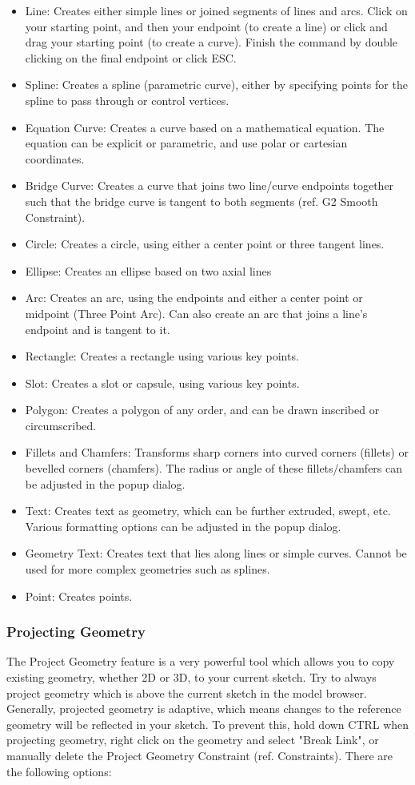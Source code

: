 \begin{itemize}
\item Line: Creates either simple lines or joined segments of lines and arcs. Click on your starting point, and then your endpoint (to create a line) or click and drag your starting point (to create a curve). Finish the command by double clicking on the final endpoint or click ESC.
\item Spline: Creates a spline (parametric curve), either by specifying points for the spline to pass through or control vertices. 
\item Equation Curve: Creates a curve based on a mathematical equation. The equation can be explicit or parametric, and use polar or cartesian coordinates.
\item Bridge Curve: Creates a curve that joins two line/curve endpoints together such that the bridge curve is tangent to both segments (ref. G2 Smooth Constraint).
\item Circle: Creates a circle, using either a center point or three tangent lines.
\item Ellipse: Creates an ellipse based on two axial lines
\item Arc: Creates an arc, using the endpoints and either a center point or midpoint (Three Point Arc). Can also create an arc that joins a line's endpoint and is tangent to it.
\item Rectangle: Creates a rectangle using various key points.
\item Slot: Creates a slot or capsule, using various key points.
\item Polygon: Creates a polygon of any order, and can be drawn inscribed or circumscribed.
\item Fillets and Chamfers: Transforms sharp corners into curved corners (fillets) or bevelled corners (chamfers). The radius or angle of these fillets/chamfers can be adjusted in the popup dialog.
\item Text: Creates text as geometry, which can be further extruded, swept, etc. Various formatting options can be adjusted in the popup dialog.
\item Geometry Text: Creates text that lies along lines or simple curves. Cannot be used for more complex geometries such as splines.
\item Point: Creates points.

\end{itemize}

\subsubsection{Projecting Geometry}
The Project Geometry feature is a very powerful tool which allows you to copy existing geometry, whether 2D or 3D, to your current sketch. Try to always project geometry which is above the current sketch in the model browser. Generally, projected geometry is adaptive, which means changes to the reference geometry will be reflected in your sketch. To prevent this, hold down CTRL when projecting geometry, right click on the geometry and select "Break Link", or manually delete the Project Geometry Constraint (ref. Constraints). There are the following options:

